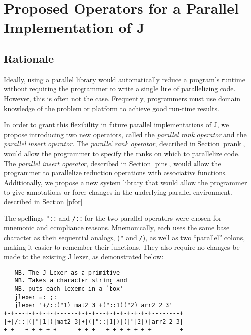 \chapter{Proposed Operators for a Parallel Implementation of J} 
\label{paraop}

\section{Rationale}
Ideally, using a parallel library would automatically reduce a program's runtime
without requiring the programmer to write a single line of parallelizing code. 
However, this is often not the case. 
Frequently, programmers must use domain knowledge of the problem or platform to achieve good run-time results. 

In order to grant this flexibility in future parallel implementations of J, 
we propose introducing two new operators, called the \textit{parallel rank operator} 
and the \textit{parallel insert operator}.
The \textit{parallel rank operator}, described in Section \ref{prank}, 
would allow the programmer to specify the ranks on which to parallelize code.
The \textit{parallel insert operator}, described in Section \ref{pins}, 
would allow the programmer to parallelize reduction operations with associative functions.
Additionally, we propose a new system library
that would allow the programmer to give annotations or force changes in the underlying parallel environment,
described in Section \ref{pfor}

The spellings \texttt{"::}  and \texttt{/::} for the two parallel operators were chosen for mnemonic and compliance reasons.
Mnemonically, each uses the same base character as their sequential analogs, (\texttt{"} and \texttt{/}), 
as well as two ``parallel'' colons, making it easier to remember their functions.
They also require no changes be made to the existing J lexer\cite{ioj}, 
as demonstrated below:

\begin{singlespacing}
\begin{small}
\begin{verbatim}
   NB. The J Lexer as a primitive
   NB. Takes a character string and 
   NB. puts each lexeme in a `box'
   jlexer =: ;:
   jlexer '+/::("1) mat2_3 +("::1)("2) arr2_2_3'
+-+---+-+-+-+-+------+-+-+---+-+-+-+-+-+-+--------+
|+|/::|(|"|1|)|mat2_3|+|(|"::|1|)|(|"|2|)|arr2_2_3|
+-+---+-+-+-+-+------+-+-+---+-+-+-+-+-+-+--------+
\end{verbatim}
\end{small}
\end{singlespacing}

